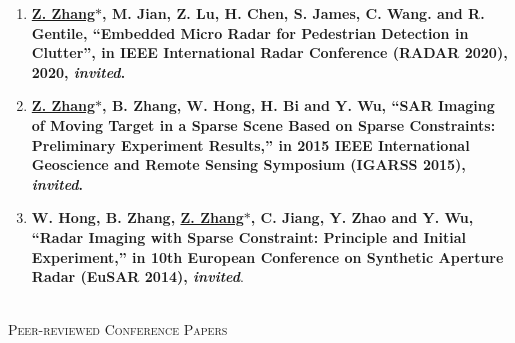 \documentclass[paper=a4,fontsize=11pt]{scrartcl}
\begin{document}
\begin{enumerate}
	
	\item \textbf{\underline{Z. Zhang$\ast$}, M. Jian, Z. Lu, H. Chen, S. James, C. Wang. and R. Gentile, ``Embedded Micro Radar for Pedestrian Detection in Clutter'', in IEEE International Radar Conference (RADAR 2020), 2020, \emph{invited}.}
	
	\item \textbf{\underline{Z. Zhang$\ast$}, B. Zhang, W. Hong, H. Bi and Y. Wu, ``SAR Imaging of Moving Target in a Sparse Scene Based on Sparse Constraints: Preliminary Experiment Results,'' in 2015 IEEE International Geoscience and Remote Sensing Symposium (IGARSS 2015), \emph{invited}.}
	
	\item \textbf{W. Hong, B. Zhang, \underline{Z. Zhang$\ast$}, C. Jiang, Y. Zhao and Y. Wu, ``Radar Imaging with Sparse Constraint: Principle and Initial Experiment,'' in 10th European Conference on Synthetic Aperture Radar (EuSAR 2014), \emph{invited}}.
	
	
\end{enumerate}

~\\

\textsc{Peer-reviewed Conference Papers}
\end{document}
